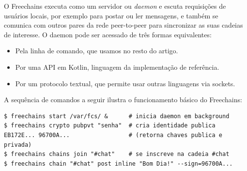 \documentclass[12pt]{article}
\newcommand{\FC} {Freechains\xspace}
\begin{document}
O \FC executa como um servidor ou \emph{daemon} e escuta requisições de
usuários locais, por exemplo para postar ou ler mensagens, e também se comunica
com outros pares da rede peer-to-peer para sincronizar as suas cadeias de
interesse.
O daemon pode ser acessado de três formas equivalentes:
%
\begin{itemize}
\item Pela linha de comando, que usamos no resto do artigo.
\item Por uma API em Kotlin, linguagem da implementação de referência.
\item Por um protocolo textual, que permite usar outras linguagens via sockets.
\end{itemize}
%

%
A sequência de comandos a seguir ilustra o funcionamento básico do \FC:

{\footnotesize
\begin{verbatim}
$ freechains start /var/fcs/ &      # inicia daemon em background
$ freechains crypto pubpvt "senha"  # cria identidade publica
EB172E... 96700A...                 # (retorna chaves publica e privada)
$ freechains chains join "#chat"    # se inscreve na cadeia #chat
$ freechains chain "#chat" post inline "Bom Dia!" --sign=96700A...
\end{verbatim}
}
\end{document}
